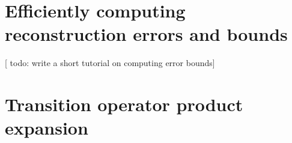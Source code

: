 \documentclass[notitlepage,twocolumn]{revtex4-2}
\renewcommand{\set}[1]{\{#1\}} %
\newcommand{\D}{\mathcal{D}}
\newcommand{\I}{\mathcal{I}}
\renewcommand{\L}{\mathcal{L}}
\newcommand{\N}{\mathcal{N}}
\def\oket#1{\mathinner{|{#1})}}
\def\obk#1{\mathinner{({#1})}}
\newcommand{\red}[1]{{\color{red} #1}}
\begin{document}
\section{Efficiently computing reconstruction errors and bounds}
\label{sec:compute}

[\red{todo: write a short tutorial on computing error bounds}]


\section{Transition operator product expansion}
\label{sec:trans_prod}
\end{document}

